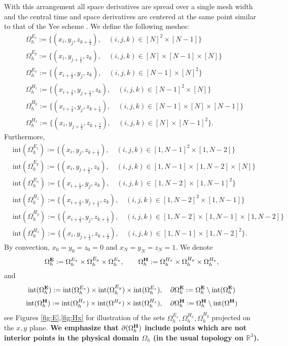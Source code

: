 \documentclass[12pt,reqno]{amsart}
\newcommand{\R}{\mathbb{R}}
\newcommand{\e}{{\bf E}}
\newcommand{\h}{{\bf H}}
\theoremstyle{definition}
\numberwithin{equation}{section}
\def\Gw{\Omega}     \def\Gx{\Xi}         \def\Gy{\Psi}
\def\Gwh{\Omega_h}
\begin{document}
	
	With this arrangement all space derivatives are spread over a single mesh width and the central time and space derivatives
	are centered at the same point similar to that of the Yee scheme \cite{yee}. 
	We define the following meshes:
	\begin{align*}
		&\Gwh^{E_z}:=\{(x_i,y_j,z_{k+\frac{1}{2}}),\quad (i,j,k)\in [N]^2 \times[N-1]\} \\
		& \Gwh^{E_y}:=\{(x_i,y_{j+\frac{1}{2}},z_{k}), \quad (i,j,k)\in [N]\times [N-1] \times[N] \}\\
		& \Gwh^{E_x}:=\{ (x_{i+\frac{1}{2}},y_{j},z_{k}),\quad (i,j,k) \in [N-1]\times [N]^2 \} \\
		&\Gwh^{H_z}:=\{ (x_{i+\frac{1}{2}},y_{j+\frac{1}{2}},z_{k}),\quad (i,j,k)\in [N-1]^2\times[N] \}\\
		&\Gwh^{H_y}:=\{ (x_{i+\frac{1}{2}},y_j,z_{k+\frac{1}{2}}),\quad (i,j,k) \in [N-1]\times [N] \times [N-1] \}\\
		& \Gwh^{H_x}:=\{ (x_i,y_{j+\frac{1}{2}},z_{k+\frac{1}{2}}), \quad (i,j,k) \in [N]\times [N-1]^2\}.
	\end{align*}
Furthermore,
	\begin{align*}
	&\mathrm{int}(\Gwh^{E_z}):=\{(x_i,y_j,z_{k+\frac{1}{2}}),\quad (i,j,k)\in [1,N-1]^2 \times[1,N-2]\} \\
	&\mathrm{int}( \Gwh^{E_y}):=\{(x_i,y_{j+\frac{1}{2}},z_{k}), \quad (i,j,k)\in [1,N-1]\times [1,N-2] \times[N] \}\\
	& \mathrm{int}(\Gwh^{E_x}):=\{ (x_{i+\frac{1}{2}},y_{j},z_{k}),\quad (i,j,k) \in [1,N-2]\times [1,N-1]^2 \} \\
	&\mathrm{int}(\Gwh^{H_z}):=\{ (x_{i+\frac{1}{2}},y_{j+\frac{1}{2}},z_{k}),\quad (i,j,k)\in [1,N-2]^2\times[1,N-1] \}\\
	&\mathrm{int}(\Gwh^{H_y}):=\{ (x_{i+\frac{1}{2}},y_j,z_{k+\frac{1}{2}}),\quad (i,j,k) \in [1,N-2]\times [1,N-1] \times [1,N-2] \}\\
	& \mathrm{int}(\Gwh^{H_x}):=\{ (x_i,y_{j+\frac{1}{2}},z_{k+\frac{1}{2}}), \quad (i,j,k) \in [1,N-1]\times [1,N-2]^2\}.
\end{align*}
By convection, $x_0=y_0=z_0=0$ and $x_N=y_N=z_N=1$.
	We denote 
$$
\Gwh^{{\bf E}}:=\Gwh^{E_x}\times \Gwh^{E_y}\times \Gwh^{E_z}, \qquad 
\Gwh^{\bf H}:=
\Gwh^{H_x}\times \Gwh^{H_y}\times \Gwh^{H_z},
$$
and 
$$
\mathrm{int}(\Gwh^{{\e}}):=\mathrm{int}(\Gwh^{E_x})\times \mathrm{int}(\Gwh^{E_y})\times \mathrm{int}(\Gwh^{E_z}),
\quad \partial \Gwh^\e:=\Gwh^\e\setminus  \mathrm{int}(\Gwh^{\e})
$$
$$
\mathrm{int}(\Gwh^{\h}):=
\mathrm{int}(\Gwh^{H_x})\times \mathrm{int}(\Gw^{H_y})\times \mathrm{int}(\Gwh^{H_z}),
\quad \partial \Gwh^\h:=\Gwh^\h\setminus  \mathrm{int}(\Gw^{\h})
$$
see Figures \ref{fig:E},\ref{fig:Hx} for illustration of the sets 
$\Gwh^{E_z}, \Gwh^{H_x},\Gwh^{H_y}$ projected on the $x,y$ plane.
{\bf We emphasize that $\partial(\Gwh^\h)$ include points which are not interior points
	 in the physical domain $\Gwh$	 (in the usual topology on $\R^3$). }
\end{document}

